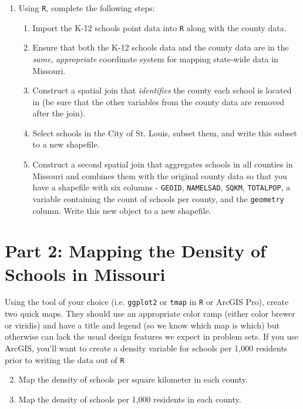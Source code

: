 \documentclass{tufte-handout}
\begin{document}
\begin{enumerate}
\item Using \texttt{R}, complete the following steps:
\begin{enumerate}
\item Import the K-12 schools point data into \texttt{R} along with the county data.
\item Ensure that both the K-12 schools data and the county data are in the \textit{same}, \textit{appropriate} coordinate system for mapping state-wide data in Missouri.
\item Construct a spatial join that \textit{identifies} the county each school is located in (be sure that the other variables from the county data are removed after the join).
\item Select schools in the City of St. Louis, subset them, and write this subset to a new shapefile.
\item Construct a second spatial join that aggregates schools in all counties in Missouri and combines them with the original county data so that you have a shapefile with six columns - \texttt{GEOID}, \texttt{NAMELSAD}, \texttt{SQKM}, \texttt{TOTALPOP}, a variable containing the count of schools per county, and the \texttt{geometry} column. Write this new object to a new shapefile.
\end{enumerate}
\end{enumerate}

\vspace{5mm}
\section{Part 2: Mapping the Density of Schools in Missouri}
Using the tool of your choice (i.e. \texttt{ggplot2} or \texttt{tmap} in \texttt{R} or ArcGIS Pro), create two quick maps. They should use an appropriate color ramp (either color brewer or viridis) and have a title and legend (so we know which map is which) but otherwise can lack the usual design features we expect in problem sets. If you use ArcGIS, you'll want to create a density variable for schools per 1,000 residents prior to writing the data out of \texttt{R}

\begin{enumerate}
\setcounter{enumi}{1}
\item Map the density of schools per square kilometer in each county. 
\item Map the density of schools per 1,000 residents in each county.
\end{enumerate}

\end{document}
